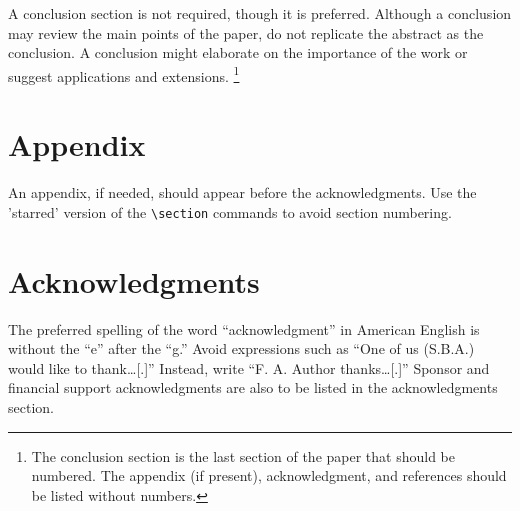 \documentclass{aiaa-tc}%
\begin{document}
A conclusion section is not required, though it is preferred.
Although a conclusion may review the main points of the paper, do not
replicate the abstract as the conclusion.
A conclusion might elaborate on the importance of the work or suggest
applications and extensions.%
\footnote{The conclusion section is the last section of
  the paper that should be numbered.
  The appendix (if present), acknowledgment, and references should be
  listed without numbers.}

\section*{Appendix}

An appendix, if needed, should appear before the acknowledgments.
Use the 'starred' version of the \verb|\section| commands to avoid
section numbering.

\section*{Acknowledgments}

The preferred spelling of the word ``acknowledgment'' in American
English is without the ``e'' after the ``g.''
Avoid expressions such as ``One of us (S.B.A.) would like to thank\ldots[.]''
Instead, write ``F. A. Author thanks\ldots[.]''
Sponsor and financial support acknowledgments are also to be listed in
the acknowledgments section.



\end{document}
